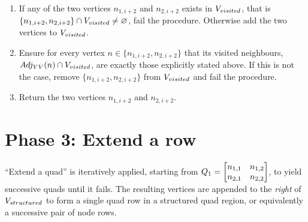 \begin{enumerate}


\item If any of the two vertices $n_{1,i+2}$ and $n_{2,i+2}$ exists in $V_{visited}$, that is $\{ n_{1,i+2} , n_{2,i+2} \} \cap V_{visited} \neq \varnothing$, fail the procedure.
Otherwise add the two vertices to $V_{visited}$.

\item Ensure for every vertex $n \in \{ n_{1,i+2} , n_{2,i+2} \}$ that its visited neighbours, $Adj_{VV}(n) \cap V_{visited}$, are exactly those explicitly stated above. If this is not the case, remove $\{ n_{1,i+2} , n_{2,i+2} \}$ from $V_{visited}$ and fail the procedure.

\item Return the two vertices $n_{1,i+2}$ and $n_{2,i+2}$.
\end{enumerate}








\section{Phase 3: Extend a row}
``Extend a quad'' is iteratively applied, starting from $Q_1 = \begin{bmatrix} n_{1,1} & n_{1,2} \\ n_{2,1} & n_{2,2} \end{bmatrix}$, to yield successive quads until it fails.
The resulting vertices are appended to the \emph{right} of $V_{structured}$ to form a single quad row in a structured quad region, or equivalently a successive pair of node rows.

